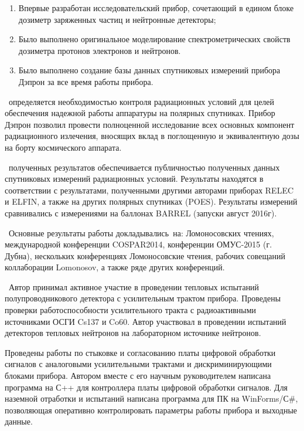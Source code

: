 \novelty
\begin{enumerate}
  \item Впервые разработан исследовательский прибор, сочетающий в едином блоке дозиметр заряженных частиц и нейтронные детекторы;
  \item Было выполнено оригинальное моделирование спектрометрических свойств дозиметра протонов электронов и нейтронов.
  \item Было выполнено создание базы данных спутниковых измерений прибора Дэпрон за все время работы прибора.
\end{enumerate}

\influence\ определяется необходимостью контроля радиационных условий для целей обеспечения надежной работы аппаратуры на полярных спутниках. Прибор Дэпрон позволил провести полноценной исследование всех основных компонент радиационного излечения, вносящих вклад в поглощенную и эквивалентную дозы на борту космического аппарата. 

\reliability\ полученных результатов обеспечивается публичностью полученных данных спутниковых измерений радиационных условий. Результаты находятся в соответствии с результатами, полученными другими авторами приборах RELEC и ELFIN, а также на других полярных спутниках (POES). Результаты измерений сравнивались с измерениями на баллонах BARREL (запуски август 2016г).

\probation\
Основные результаты работы докладывались~на:
Ломоносовских чтениях, международной конференции COSPAR2014, конференции ОМУС-2015 (г. Дубна), нескольких конференциях Ломоносовские чтения, рабочих совещаний коллаборации Lomonosov, а также ряде других конференций.

\contribution\ Автор принимал активное участие в проведении тепловых испытаний полупроводникового детектора с усилительным трактом прибора. Проведены проверки работоспособности усилительного тракта с радиоактивными источниками ОСГИ Cs137 и Co60. Автор участвовал в проведении испытаний детекторов тепловых нейтронов на лабораторном источнике нейтронов. 

Проведены работы по стыковке и согласованию платы цифровой обработки сигналов с аналоговыми усилительными трактами и дискриминирующими блоками прибора. Автором вместе с его научным руководителем написана программа на С++ для контроллера платы цифровой обработки сигналов. Для наземной отработки и испытаний написана программа для ПК на WinForms/С\#, позволяющая оперативно контролировать параметры работы прибора и выходные данные. 

